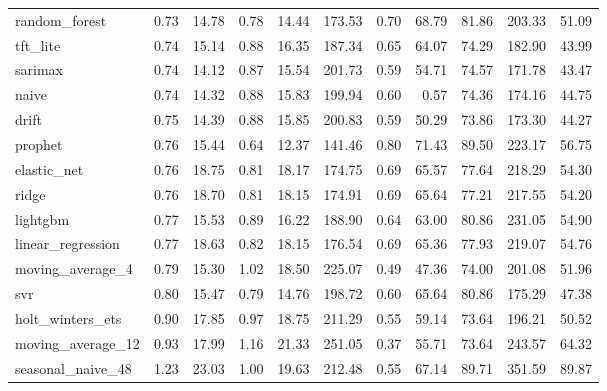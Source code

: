\begin{table}
\begin{tabular}{lrrrrrrrrrr}
random_forest & 0.73 & 14.78 & 0.78 & 14.44 & 173.53 & 0.70 & 68.79 & 81.86 & 203.33 & 51.09 \\
tft_lite & 0.74 & 15.14 & 0.88 & 16.35 & 187.34 & 0.65 & 64.07 & 74.29 & 182.90 & 43.99 \\
sarimax & 0.74 & 14.12 & 0.87 & 15.54 & 201.73 & 0.59 & 54.71 & 74.57 & 171.78 & 43.47 \\
naive & 0.74 & 14.32 & 0.88 & 15.83 & 199.94 & 0.60 & 0.57 & 74.36 & 174.16 & 44.75 \\
drift & 0.75 & 14.39 & 0.88 & 15.85 & 200.83 & 0.59 & 50.29 & 73.86 & 173.30 & 44.27 \\
prophet & 0.76 & 15.44 & 0.64 & 12.37 & 141.46 & 0.80 & 71.43 & 89.50 & 223.17 & 56.75 \\
elastic_net & 0.76 & 18.75 & 0.81 & 18.17 & 174.75 & 0.69 & 65.57 & 77.64 & 218.29 & 54.30 \\
ridge & 0.76 & 18.70 & 0.81 & 18.15 & 174.91 & 0.69 & 65.64 & 77.21 & 217.55 & 54.20 \\
lightgbm & 0.77 & 15.53 & 0.89 & 16.22 & 188.90 & 0.64 & 63.00 & 80.86 & 231.05 & 54.90 \\
linear_regression & 0.77 & 18.63 & 0.82 & 18.15 & 176.54 & 0.69 & 65.36 & 77.93 & 219.07 & 54.76 \\
moving_average_4 & 0.79 & 15.30 & 1.02 & 18.50 & 225.07 & 0.49 & 47.36 & 74.00 & 201.08 & 51.96 \\
svr & 0.80 & 15.47 & 0.79 & 14.76 & 198.72 & 0.60 & 65.64 & 80.86 & 175.29 & 47.38 \\
holt_winters_ets & 0.90 & 17.85 & 0.97 & 18.75 & 211.29 & 0.55 & 59.14 & 73.64 & 196.21 & 50.52 \\
moving_average_12 & 0.93 & 17.99 & 1.16 & 21.33 & 251.05 & 0.37 & 55.71 & 73.64 & 243.57 & 64.32 \\
seasonal_naive_48 & 1.23 & 23.03 & 1.00 & 19.63 & 212.48 & 0.55 & 67.14 & 89.71 & 351.59 & 89.87 \\
\bottomrule
\end{tabular}
\end{table}
